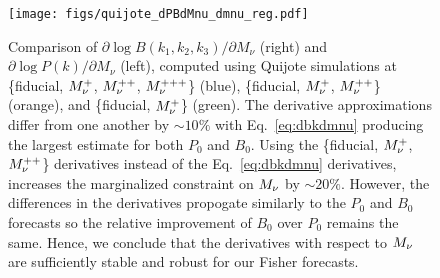 \begin{figure}
\begin{center}
    \texttt{[image: figs/quijote\_dPBdMnu\_dmnu\_reg.pdf]} 
    \caption{Comparison of $\partial \log B(k_1, k_2, k_3)/\partial M_\nu$ (right) 
    and $\partial \log P(k)/\partial M_\nu$ (left), computed using Quijote simulations 
    at \{fiducial, $M_\nu^{+}$, $M_\nu^{++}$, $M_\nu^{+++}$\} (blue), 
    \{fiducial, $M_\nu^{+}$, $M_\nu^{++}$\} (orange), and \{fiducial, $M_\nu^{+}$\} 
    (green). The derivative approximations differ from one another by $\sim10\%$ with 
    Eq.~\ref{eq:dbkdmnu} producing the largest estimate for both $P_0$ and $B_0$.
    Using the \{fiducial, $M_\nu^{+}$, $M_\nu^{++}$\} derivatives instead of the 
    Eq.~\ref{eq:dbkdmnu} derivatives, increases the marginalized constraint on $M_\nu$ 
    by $\sim 20\%$. However, the differences in the derivatives propogate similarly to 
    the $P_0$ and $B_0$ forecasts so the relative improvement of $B_0$ over $P_0$
    remains the same. Hence, we conclude that the derivatives with respect to $M_\nu$ 
    are sufficiently stable and robust for our Fisher forecasts.
    }
\label{fig:dPBdmnu}
\end{center}
\end{figure}
